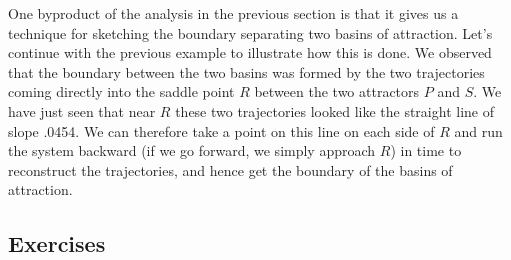 One byproduct of the analysis in the previous section is that it gives
us a technique for sketching the boundary separating two basins of
attraction. Let's continue with the previous example to illustrate how
this is done. We observed that the boundary between the two basins was
formed by the two trajectories coming directly into the saddle point
$R$ between the two attractors $P$ and $S$.  We have just seen that
near $R$ these two trajectories looked like the straight line of slope
.0454.  We can therefore take a point on this line on each side of $R$
and run the system backward (if we go forward, we simply approach $R$)
in time to reconstruct the trajectories, and hence get the boundary of
the basins of attraction.


\subsection{Exercises}
\label{subsec:exercises}



